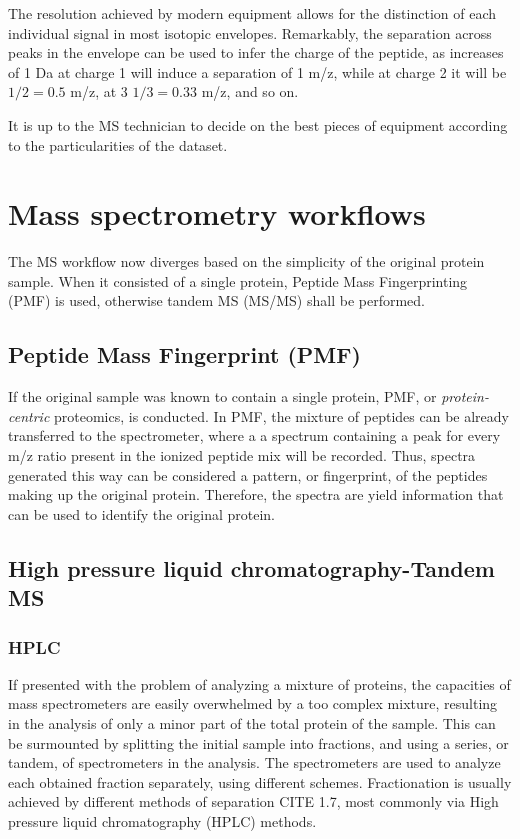 \documentclass[11pt, a4paper]{report}
\begin{document}
The resolution achieved by modern equipment allows for the distinction of each individual signal in most isotopic envelopes. Remarkably, the separation across peaks in the envelope can be used to infer the charge of the peptide, as increases of 1 Da at charge 1 will induce a separation of 1 \ac{m/z}, while at charge 2 it will be $1/2 = 0.5$ \ac{m/z}, at 3 $1/3 = 0.33$ \ac{m/z}, and so on.

It is up to the \ac{MS} technician to decide on the best pieces of equipment according to the particularities of the dataset.

\section{Mass spectrometry workflows}
\label{sec:mass_spectrometry_workflows}

The \ac{MS} workflow now diverges based on the simplicity of the original protein sample. When it consisted of a single protein, Peptide Mass Fingerprinting (PMF) is used, otherwise tandem MS (MS/MS) shall be performed. 

\subsection{Peptide Mass Fingerprint (PMF)}
\label{subsec:pmf}

If the original sample was known to contain a single protein, PMF, or \textit{protein-centric} proteomics, is conducted. In PMF, the mixture of peptides can be already transferred to the spectrometer, where a a spectrum containing a peak for every m/z ratio present in the ionized peptide mix will be recorded. Thus, spectra generated this way can be considered a pattern, or fingerprint, of the peptides making up the original protein. Therefore, the spectra are yield information that can be used to identify the original protein.


\subsection{High pressure liquid chromatography-Tandem MS}
\label{subsec:ms2}

\subsubsection{HPLC}

If presented with the problem of analyzing a mixture of proteins, the capacities of mass spectrometers are easily overwhelmed by a too complex mixture, resulting in the analysis of only a minor part of the total protein  of the sample. This can be surmounted by splitting the initial sample into fractions, and using a series, or tandem, of spectrometers in the analysis. The spectrometers are used to analyze each obtained fraction separately, using different schemes. Fractionation is usually achieved by different methods of separation CITE 1.7, most commonly via High pressure liquid chromatography (\ac{HPLC}) methods. 
\end{document}

